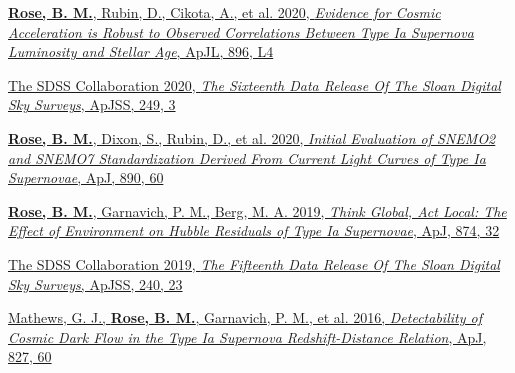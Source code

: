 \documentclass[margin]{res}
\begin{document}
\begin{resume}
\hangindent=15pt 
\href{https://ui.adsabs.harvard.edu/abs/2020ApJ...896L...4R/abstract}{{\bf Rose, B. M.}, Rubin, D., Cikota, A., et al. 2020, {\sl Evidence for Cosmic Acceleration is Robust to Observed Correlations Between Type Ia Supernova Luminosity and Stellar Age}, ApJL, 896, L4}
\vspace{-12pt}

\hangindent=15pt 
\href{https://ui.adsabs.harvard.edu/abs/2020ApJS..249....3A/abstract}{The SDSS Collaboration 2020, {\sl The Sixteenth Data Release Of The Sloan Digital Sky Surveys}, ApJSS, 249, 3}
\vspace{-12pt}


\hangindent=15pt
\href{https://ui.adsabs.harvard.edu/#abs/2019arXiv191209993R/abstract}{{\bf Rose, B. M.}, Dixon, S., Rubin, D., et al.  2020, {\sl Initial Evaluation of SNEMO2 and SNEMO7 Standardization Derived From Current Light Curves of Type Ia Supernovae}, ApJ, 890, 60} %
\vspace{-12pt}

\hangindent=15pt 
\href{https://ui.adsabs.harvard.edu/#abs/2019arXiv190201433R/abstract}{{\bf Rose, B. M.}, Garnavich, P. M., Berg, M. A. 2019, {\sl Think Global, Act Local: The Effect of Environment on Hubble Residuals of Type Ia Supernovae}, ApJ, 874, 32}
\vspace{-12pt}

\hangindent=15pt 
\href{https://ui.adsabs.harvard.edu/#abs/2018arXiv181202759A/abstract}{The SDSS Collaboration 2019, {\sl The Fifteenth Data Release Of The Sloan Digital Sky Surveys}, ApJSS, 240, 23}
\vspace{-12pt}

\hangindent=15pt 
\href{https://ui.adsabs.harvard.edu/#abs/2016ApJ...827...60M/abstract}{Mathews, G. J., {\bf Rose, B. M.}, Garnavich, P. M., et al. 2016, {\sl Detectability of Cosmic Dark Flow in the Type Ia Supernova Redshift-Distance Relation}, ApJ, 827, 60}


\end{resume}
\end{document}
